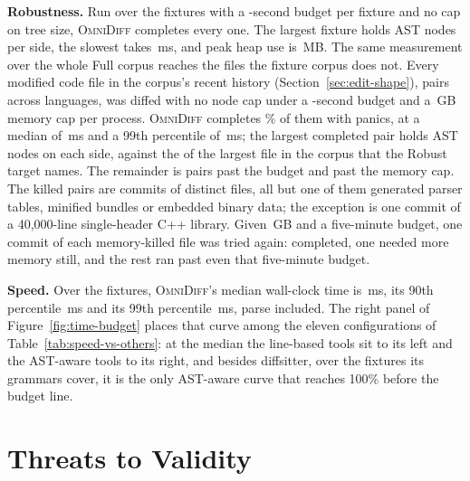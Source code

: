 \documentclass[sigconf]{acmart}
\begin{document}
\textbf{Robustness.} Run over the \RobustnessFixtures{} fixtures with a
\RobustnessTimeoutSeconds{}-second budget per fixture and no cap on tree size,
\textsc{OmniDiff} completes every one. The largest fixture holds \RobustnessMaxNodes{}
AST nodes per side, the slowest takes \RobustnessSlowestMs{}\,ms, and peak heap use is
\RobustnessPeakMemoryMb{}\,MB. The same measurement over the whole Full corpus reaches the files
the fixture corpus does not. Every modified code file in the corpus's recent history
(Section~\ref{sec:edit-shape}), \RobustnessFullAttempted{} pairs across
\RobustnessFullLanguages{} languages, was diffed with no node cap under a
\RobustnessFullTimeoutSeconds{}-second budget and a \RobustnessFullMemoryCapGb{}\,GB memory cap
per process. \textsc{OmniDiff} completes \RobustnessFullCompletedPct{}\% of them with
\RobustnessFullPanicked{} panics, at a median of \RobustnessFullPFiftyMs{}\,ms and a 99th
percentile of \RobustnessFullPNinetyNineMs{}\,ms; the largest completed pair holds
\RobustnessFullMaxSideNodes{} AST nodes on each side, against the \AstMax{} of the largest file
in the corpus that the Robust target names. The remainder is \RobustnessFullTimedOut{} pairs past
the budget and \RobustnessFullKilled{} past the memory cap. The killed pairs are commits of
\RobustnessFullKilledFiles{} distinct files, all but one of them generated parser tables,
minified bundles or embedded binary data; the exception is one commit of a 40,000-line
single-header C++ library. Given \RobustnessFullBigMemoryCapGb{}\,GB and a five-minute budget, one
commit of each memory-killed file was tried again: \RobustnessFullKilledFilesCompletedUnderBigCap{}
completed, one needed more memory still, and the rest ran past even that five-minute budget.

\textbf{Speed.} Over the \OmniDiffFixtures{} fixtures, \textsc{OmniDiff}'s median wall-clock time
is \SpeedOmniDiffPFifty{}\,ms, its 90th percentile \SpeedOmniDiffPNinety{}\,ms and its 99th
percentile \SpeedOmniDiffPNinetyNine{}\,ms, parse included. The right panel of
Figure~\ref{fig:time-budget} places that curve among the eleven configurations of
Table~\ref{tab:speed-vs-others}: at the median the line-based tools sit to its left and the
AST-aware tools to its right, and besides diffsitter, over the \DiffsitterFixtures{} fixtures its
grammars cover, it is the only AST-aware curve that reaches 100\% before the budget line.

\section{Threats to Validity}
\label{sec:threats}
\end{document}

